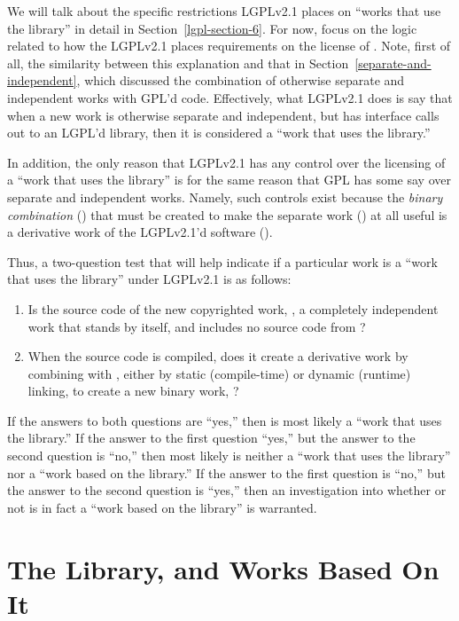 We will talk about the specific restrictions LGPLv2.1 places on ``works
that use the library'' in detail in Section~\ref{lgpl-section-6}. For
now, focus on the logic related to how the LGPLv2.1 places requirements on
the license of \lplusi{}. Note, first of all, the similarity between
this explanation and that in Section~\ref{separate-and-independent},
which discussed the combination of otherwise separate and independent
works with GPL'd code. Effectively, what LGPLv2.1 does is say that when a
new work is otherwise separate and independent, but has interface
calls out to an LGPL'd library, then it is considered a ``work that
uses the library.''

In addition, the only reason that LGPLv2.1 has any control over the licensing
of a ``work that uses the library'' is for the same reason that GPL has
some say over separate and independent works. Namely, such controls exist
because the {\em binary combination\/} (\lplusi{}) that must be created to
make the separate work (\worki{}) at all useful is a derivative work of
the LGPLv2.1'd software (\workl{}).

Thus, a two-question test that will help indicate if a particular work is
a ``work that uses the library'' under LGPLv2.1 is as follows:

\begin{enumerate}

\item Is the source code of the new copyrighted work, \worki{}, a
  completely independent work that stands by itself, and includes no
  source code from \workl{}?

\item When the source code is compiled, does it create a derivative work
  by combining with \workl{}, either by static (compile-time) or dynamic
  (runtime) linking, to create a new binary work, \lplusi{}?
\end{enumerate}

If the answers to both questions are ``yes,'' then \worki{} is most likely
a ``work that uses the library.''  If the answer to the first question
``yes,'' but the answer to the second question is ``no,'' then most likely
\worki{} is neither a ``work that uses the library'' nor a ``work based on
the library.''  If the answer to the first question is ``no,'' but the
answer to the second question is ``yes,'' then an investigation into
whether or not \worki{} is in fact a ``work based on the library'' is
warranted.

\section{The Library, and Works Based On It}

